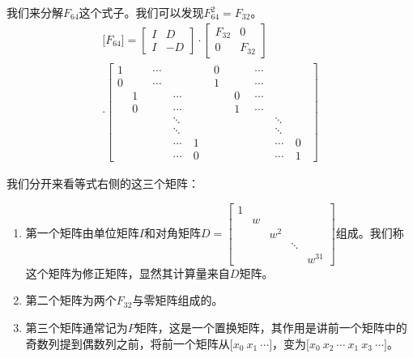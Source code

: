 我们来分解$F_{64}$这个式子。我们可以发现$F_{64}^2=F_{32}$。
\begin{align*}
	\Bigg[F_{64}\Bigg]=\begin{bmatrix}
		I & D \\I&-D
	\end{bmatrix}
	\cdot
	\begin{bmatrix}F_{32}&0\\0&F_{32}\end{bmatrix} \\
	\cdot
	\begin{bmatrix}
		1 & \quad & \cdots & \quad  & \quad & 0     & \quad & \cdots & \quad  & \quad \\
		0 & \quad & \cdots & \quad  & \quad & 1     & \quad & \cdots & \quad  & \quad \\
		  & 1     & \quad  & \cdots & \quad & \quad & 0     & \cdots & \quad  & \quad \\
		  & 0     & \quad  & \cdots & \quad & \quad & 1     & \cdots & \quad  & \quad \\
		  & \quad & \quad  & \ddots & \quad & \quad & \quad & \quad  & \ddots & \quad \\
		  & \quad & \quad  & \ddots & \quad & \quad & \quad & \quad  & \ddots & \quad \\
		  & \quad & \quad  & \cdots & 1     & \quad & \quad & \quad  & \cdots & 0     \\
		  & \quad & \quad  & \cdots & 0     & \quad & \quad & \quad  & \cdots & 1
	\end{bmatrix}
\end{align*}

我们分开来看等式右侧的这三个矩阵：
\begin{enumerate}
	\item 第一个矩阵由单位矩阵$I$和对角矩阵$D=\begin{bmatrix}1&&&&\\&w&&&\\&&w^2&&\\&&&\ddots&\\&&&&w^{31}\end{bmatrix}$组成。我们称这个矩阵为修正矩阵，显然其计算量来自$D$矩阵。
	\item 第二个矩阵为两个$F_{32}$与零矩阵组成的。
	\item 第三个矩阵通常记为$P$矩阵，这是一个置换矩阵，其作用是讲前一个矩阵中的奇数列提到偶数列之前，将前一个矩阵从$\Bigg[x_0\ x_1\ \cdots\Bigg]$，变为$\Bigg[x_0\ x_2\ \cdots\ x_1\ x_3\ \cdots\Bigg]$。
\end{enumerate}

